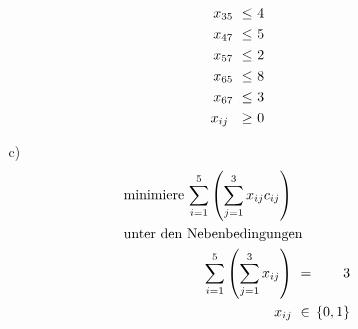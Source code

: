 \documentclass [a4paper,11pt]{article}
\begin{document}
\begin{enumerate}
\begin{enumerate}
\begin{align*}
\begin{alignedat}{8}
                &&&&        &    &         &    &         &    &\ x_{35} &\ \leq &\ 4 \\
                &&&&        &    &         &    &         &    &\ x_{47} &\ \leq &\ 5 \\
                &&&&        &    &         &    &         &    &\ x_{57} &\ \leq &\ 2 \\
                &&&&        &    &         &    &         &    &\ x_{65} &\ \leq &\ 8 \\
                &&&&        &    &         &    &         &    &\ x_{67} &\ \leq &\ 3 \\
                &&&&        &    &         &    & & & \llap{ $ x_{ij} $ } &\ \geq &\ 0
                \end{alignedat}
                \end{align*}

            \item[c)]
                \begin{align*}
                \begin{alignedat}{6}
                & \text{minimiere } & \sum_{i=1}^5 \left( \sum_{j=1}^3 x_{ij} c_{ij} \right) & & \\
                & \rlap{unter den Nebenbedingungen} & & &  \\
                && \sum_{i=1}^5 \left( \sum_{j=1}^3 x_{ij}\right) &\ = &\ 3 \\
                && \llap{$x_{ij}$} &\ \in &\ \{ 0,1 \}
                \end{alignedat}
                \end{align*}

        \end{enumerate}


\end{enumerate}
\end{document}
